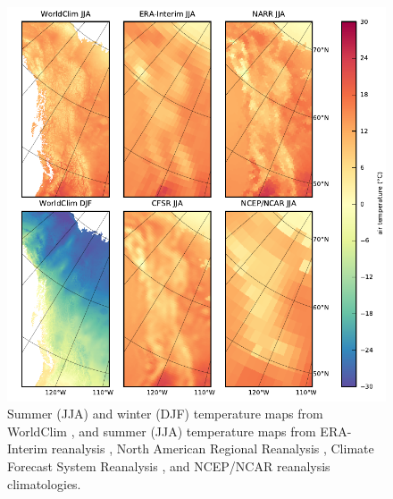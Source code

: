 \documentclass[tc, ms]{copernicus}
\begin{document}
\begin{figure}[t]
	\vspace*{2mm}
	\begin{center}
		\includegraphics{cordillera-climate-temp}
	\end{center}
	\caption{Summer (JJA) and winter (DJF) temperature maps from WorldClim \citep{data:worldclim}, and summer (JJA) temperature maps from ERA-Interim reanalysis \citep{data:erai}, North American Regional Reanalysis \citep[NARR;][]{data:narr}, Climate Forecast System Reanalysis \citep[CFSR;][]{data:cfsr}, and NCEP/NCAR reanalysis \citep{data:ncar} climatologies.}
	\label{fig:temp}
\end{figure}
\end{document}
